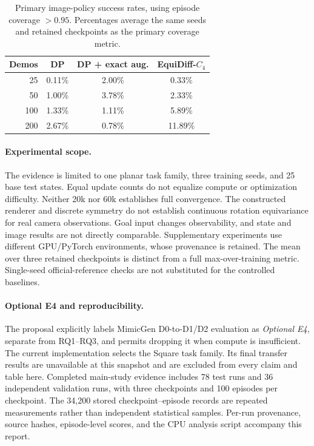 \begin{table}[t]
\centering
\caption{Primary image-policy success rates, using episode coverage $>0.95$.
Percentages average the same seeds and retained checkpoints as the primary
coverage metric.}
\label{eqstudy:tab:success}
\begin{tabular}{rccc}
\toprule
Demos & DP & DP + exact aug. & EquiDiff-$C_4$ \\
\midrule
25 & 0.11\% & 2.00\% & 0.33\% \\
50 & 1.00\% & 3.78\% & 2.33\% \\
100 & 1.33\% & 1.11\% & 5.89\% \\
200 & 2.67\% & 0.78\% & 11.89\% \\
\bottomrule
\end{tabular}
\end{table}

\paragraph{Experimental scope.}
The evidence is limited to one planar task family, three training seeds,
and 25 base test states. Equal update counts do not equalize compute or
optimization difficulty. Neither 20k nor 60k establishes full convergence.
The constructed renderer and discrete symmetry do not establish continuous
rotation equivariance for real camera observations. Goal input changes
observability, and state and image results are not directly comparable.
Supplementary experiments use different GPU/PyTorch environments, whose
provenance is retained. The mean over three retained checkpoints is distinct
from a full max-over-training metric. Single-seed official-reference checks
are not substituted for the controlled baselines.

\paragraph{Optional E4 and reproducibility.}
The proposal explicitly labels MimicGen D0-to-D1/D2 evaluation as
\emph{Optional E4}, separate from RQ1--RQ3, and permits dropping it when
compute is insufficient. The current implementation selects the Square
task family. Its final transfer results are unavailable at this snapshot
and are excluded from every claim and table here. Completed main-study
evidence includes 78 test runs and 36 independent validation runs, with
three checkpoints and 100 episodes per checkpoint. The 34,200 stored
checkpoint--episode records are repeated measurements rather than
independent statistical samples. Per-run provenance, source hashes,
episode-level scores, and the CPU analysis script accompany this report.

